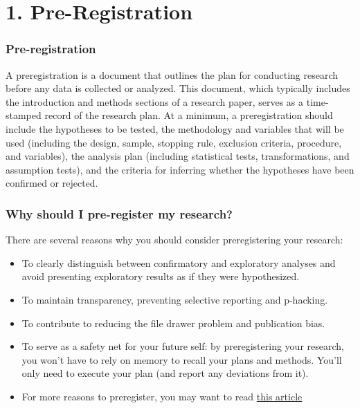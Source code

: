 \documentclass[
  letterpaper,
  DIV=11,
  numbers=noendperiod]{scrreprt}
\begin{document}

\hypertarget{pre-registration-1}{%
\chapter*{1. Pre-Registration}\label{pre-registration-1}}


\hypertarget{pre-registration-2}{%
\subsection*{\texorpdfstring{\textbf{Pre-registration}}{Pre-registration}}\label{pre-registration-2}}

A preregistration is a document that outlines the plan for conducting
research before any data is collected or analyzed. This document, which
typically includes the introduction and methods sections of a research
paper, serves as a time-stamped record of the research plan. At a
minimum, a preregistration should include the hypotheses to be tested,
the methodology and variables that will be used (including the design,
sample, stopping rule, exclusion criteria, procedure, and variables),
the analysis plan (including statistical tests, transformations, and
assumption tests), and the criteria for inferring whether the hypotheses
have been confirmed or rejected.

\hypertarget{why-should-i-pre-register-my-research}{%
\subsection*{\texorpdfstring{\textbf{Why should I pre-register my
research?}}{Why should I pre-register my research?}}\label{why-should-i-pre-register-my-research}}

There are several reasons why you should consider preregistering your
research:

\begin{itemize}
\item
  To clearly distinguish between confirmatory and exploratory analyses
  and avoid presenting exploratory results as if they were hypothesized.
\item
  To maintain transparency, preventing selective reporting and
  p-hacking.
\item
  To contribute to reducing the file drawer problem and publication
  bias.
\item
  To serve as a safety net for your future self: by preregistering your
  research, you won't have to rely on memory to recall your plans and
  methods. You'll only need to execute your plan (and report any
  deviations from it).
\item
  For more reasons to preregister, you may want to read
  \href{https://www.psychologicalscience.org/observer/seven-selfish-reasons-for-preregistration\#.WR3HblMrLOS}{this
  article}
\end{itemize}
\end{document}
